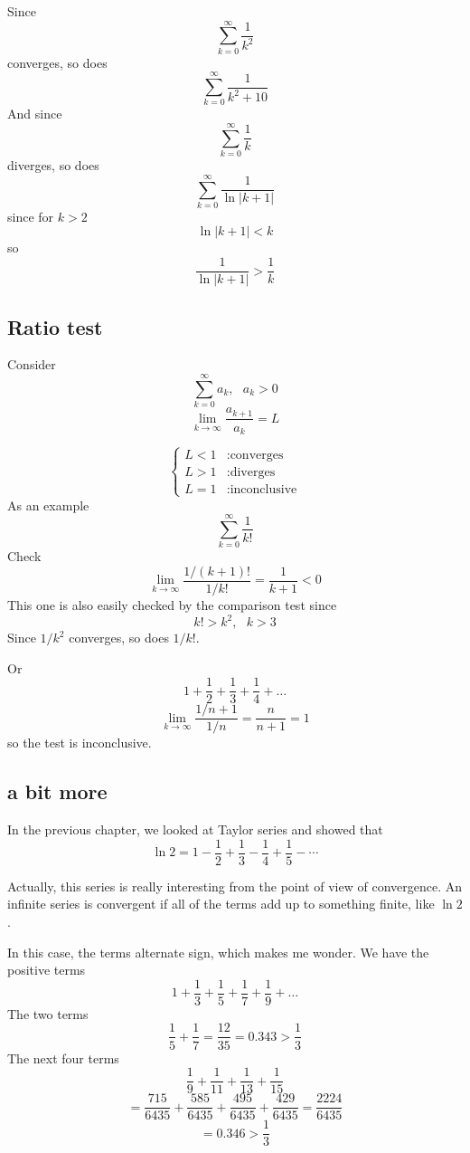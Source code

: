 \documentclass[11pt, oneside]{article}
\begin{document}
Since
\[ \sum_{k=0}^{\infty} \frac{1}{k^2} \] 
converges, so does
\[ \sum_{k=0}^{\infty} \frac{1}{k^2 + 10} \] 
And since
\[ \sum_{k=0}^{\infty} \frac{1}{k} \] 
diverges, so does
\[ \sum_{k=0}^{\infty} \frac{1}{\ln|k+1|} \] 
since for $k>2$
\[ \ln|k+1| < k \]
 so
\[ \frac{1}{\ln|k+1|} > \frac{1}{k} \]

\subsection*{Ratio test}
Consider
\[ \sum_{k=0}^{\infty} a_k, \ \ \ a_k > 0 \] 
\[ \lim_{k \rightarrow \infty} \frac{a_{k+1}}{a_k} = L \]

\begin{displaymath}
   \left\{
     \begin{array}{lr}
       L < 1 & : \text{converges} \\
       L > 1 & : \text{diverges} \\
	   L = 1 & : \text{inconclusive}
     \end{array}
   \right.
\end{displaymath} 
As an example
\[ \sum_{k=0}^{\infty} \frac{1}{k!} \]
Check
\[ \lim_{k \rightarrow \infty} \frac{1/(k+1)!}{1/k!} = \frac{1}{k+1} < 0 \]
This one is also easily checked by the comparison test since
\[ k! > k^2, \ \ \ k > 3 \]
Since $1/k^2$ converges, so does $1/k!$.

Or
\[ 1 + \frac{1}{2} + \frac{1}{3} + \frac{1}{4} + \dots \]
\[ \lim_{k \rightarrow \infty} \frac{1/n+1}{1/n} = \frac{n}{n+1} = 1 \]
so the test is inconclusive.

\subsection*{a bit more}
In the previous chapter, we looked at Taylor series and showed that
\[ \ln 2 = 1 - \frac{1}{2} + \frac{1}{3} - \frac{1}{4} + \frac{1}{5} - \cdots \]

Actually, this series is really interesting from the point of view of convergence.  An infinite series is convergent if all of the terms add up to something finite, like $\ln 2$.

In this case, the terms alternate sign, which makes me wonder.  We have the positive terms
\[ 1 + \frac{1}{3} + \frac{1}{5} + \frac{1}{7} + \frac{1}{9} +  \dots \]
The two terms
\[  \frac{1}{5} + \frac{1}{7} = \frac{12}{35} = 0.343 > \frac{1}{3} \]
The next four terms
\[ \frac{1}{9} + \frac{1}{11} + \frac{1}{13} + \frac{1}{15}  \]
\[ =  \frac{715}{6435} + \frac{585}{6435} + \frac{495}{6435} + \frac{429}{6435} = \frac{2224}{6435} \]
\[ = 0.346 > \frac{1}{3} \]
\end{document}
